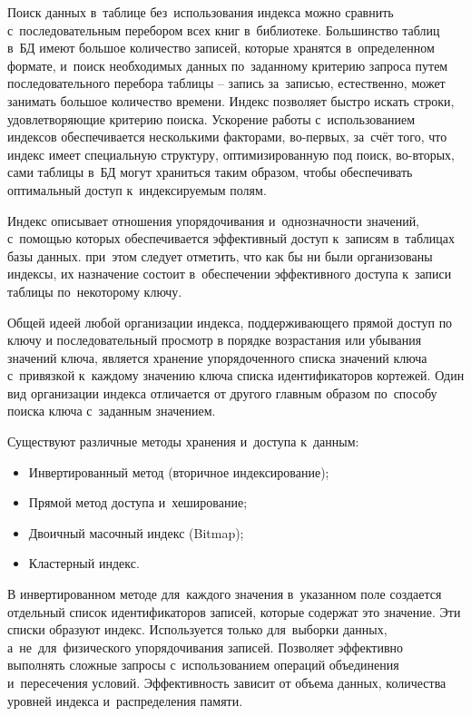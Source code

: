 \documentclass{ou}
\begin{document}
Поиск данных в~таблице без~использования индекса можно сравнить с~последовательным перебором всех книг в~библиотеке. Большинство таблиц в~БД имеют большое количество записей, которые хранятся в~определенном формате, и~поиск необходимых данных по~заданному критерию запроса путем последовательного перебора таблицы -- запись за~записью, естественно, может занимать большое количество времени. Индекс позволяет быстро искать строки, удовлетворяющие критерию поиска. Ускорение работы с~использованием индексов обеспечивается несколькими факторами, во-первых, за~счёт того, что индекс имеет специальную структуру, оптимизированную под поиск, во-вторых, сами таблицы в~БД могут храниться таким образом, чтобы обеспечивать оптимальный доступ к~индексируемым полям.

Индекс описывает отношения упорядочивания и~однозначности значений, с~помощью которых обеспечивается эффективный доступ к~записям в~таблицах базы данных. при~этом следует отметить, что как бы ни были организованы индексы, их назначение состоит в~обеспечении эффективного доступа к~записи таблицы по~некоторому ключу.

Общей идеей любой организации индекса, поддерживающего прямой доступ по ключу и последовательный просмотр в порядке возрастания или убывания значений ключа, является хранение упорядоченного списка значений ключа с~привязкой к~каждому значению ключа списка идентификаторов кортежей. Один вид организации индекса отличается от другого главным образом по~способу поиска ключа с~заданным значением. 

Существуют различные методы хранения и~доступа к~данным:
\begin{itemize}[label=-, itemindent=4em, nosep]
\item Инвертированный метод (вторичное индексирование);
\item Прямой метод доступа и~хеширование;
\item Двоичный масочный индекс (Bitmap);
\item Кластерный индекс.
\end{itemize}
В инвертированном методе для~каждого значения в~указанном поле создается отдельный список идентификаторов записей, которые содержат это значение. Эти списки образуют индекс. Используется только для~выборки данных, а~не~для~физического упорядочивания записей. Позволяет эффективно выполнять сложные запросы с~использованием операций объединения и~пересечения условий. Эффективность зависит от объема данных, количества уровней индекса и~распределения памяти.
\end{document}
